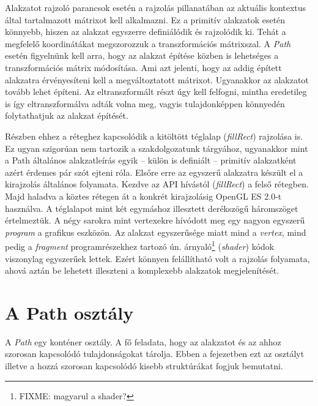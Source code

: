 \documentclass[12pt]{report}
\theoremstyle{definition}
\newcommand{\inenglish}[1]{\textsl{#1}}
\newcommand{\func}[1]{{\textsl{#1}}}
\begin{document}
Alakzatot rajzoló parancsok esetén a rajzolás pillanatában az aktuális
kontextus által tartalmazott mátrixot kell alkalmazni. Ez a primitív alakzatok
esetén könnyebb, hiszen az alakzat egyszerre definiálódik és rajzolódik ki.
Tehát a megfelelő koordinátákat megszorozzuk a transzformációs mátrixszal. A
\emph{Path} esetén figyelnünk kell arra, hogy az alakzat építése közben is
lehetséges a transzformációs mátrix módosítása. Ami azt jelenti, hogy az addig
épített alakzatra érvényesíteni kell a megváltoztatott mátrixot. Ugyanakkor az
alakzatot tovább lehet építeni. Az eltranszformált részt úgy kell felfogni,
mintha eredetileg is így eltranszformálva adták volna meg, vagyis
tulajdonképpen könnyedén folytathatjuk az alakzat építését.

Részben ehhez a réteghez kapcsolódik a kitöltött téglalap (\func{fillRect})
rajzolása is. Ez ugyan szigorúan nem tartozik a szakdolgozatunk tárgyához,
ugyanakkor mint a Path általános alakzatleírás egyik -- külön is definiált --
primitív alakzatként azért érdemes pár szót ejteni róla. Elsőre erre az
egyszerű alakzatra készült el a kirajzolás általános folyamata. Kezdve az API
hívástól (\func{fillRect}) a felső rétegben. Majd haladva a köztes rétegen át a
konkrét kirajzolásig OpenGL ES 2.0-t használva. A téglalapot mint két egymáshoz
illesztett derékszögű háromszöget értelmeztük. A négy sarokra mint vertexekre
hívódott meg egy nagyon egyszerű \emph{program} a grafikus eszközön. Az alakzat
egyszerűsége miatt mind a \emph{vertex}, mind pedig a \emph{fragment}
programrészekhez tartozó ún. árnyaló\footnote{FIXME: magyarul a shader?}
(\inenglish{shader}) kódok viszonylag egyszerűek lettek. Ezért könnyen
felállítható volt a rajzolás folyamata, ahová aztán be lehetett illeszteni a
komplexebb alakzatok megjelenítését.

    \section[A Path osztály]{A Path osztály}
    \label{A Path osztály}

A \func{Path} egy konténer osztály. A fő feladata, hogy az alakzatot és az
ahhoz szorosan kapcsolódó tulajdonságokat tárolja. Ebben a fejezetben ezt az
osztályt illetve a hozzá szorosan kapcsolódó kisebb struktúrákat fogjuk
bemutatni.
\end{document}
